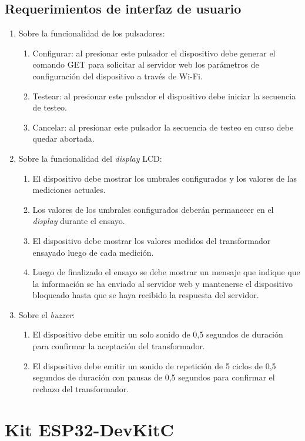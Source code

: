 \subsection{Requerimientos de interfaz de usuario}
\label{subsec:ReqUsu}
	\begin{enumerate}
	\item Sobre la funcionalidad de los pulsadores:
		\begin{enumerate}
		\item Configurar: al presionar este pulsador el dispositivo debe generar el comando GET para solicitar al servidor web los parámetros de configuración del dispositivo a través de Wi-Fi.
		\item Testear: al presionar este pulsador el dispositivo debe iniciar la secuencia de testeo.
		\item Cancelar: al presionar este pulsador la secuencia de testeo en curso debe quedar abortada.
		\end{enumerate}
	\item Sobre la funcionalidad del \textit{display} LCD:
		\begin{enumerate}
		\item El dispositivo debe mostrar los umbrales configurados y los valores de las mediciones actuales.
		\item Los valores de los umbrales configurados deberán permanecer en el \textit{display} durante el ensayo.
		\item El dispositivo debe mostrar los valores medidos del transformador ensayado luego de cada medición.
		\item Luego de finalizado el ensayo se debe mostrar un mensaje que indique que la información se ha enviado al servidor web y mantenerse el dispositivo bloqueado hasta que se haya recibido la respuesta del servidor.
		\end{enumerate}
	\item Sobre el \textit{buzzer}:
		\begin{enumerate}
		\item El dispositivo debe emitir un solo sonido de 0,5 segundos de duración para confirmar la aceptación del transformador.
		\item El dispositivo debe emitir un sonido de repetición de 5 ciclos de 0,5 segundos de duración con pausas de 0,5 segundos para confirmar el rechazo del transformador.
		\end{enumerate}		
	\end{enumerate}


\section{Kit ESP32-DevKitC}

